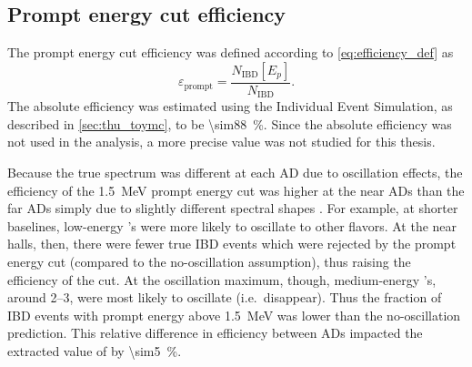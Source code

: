 \subsection{Prompt energy cut efficiency}
\label{subsec:eff_prompt}

The prompt energy cut efficiency was defined
according to \cref{eq:efficiency_def} as
\begin{equation}\label{eq:prompt_eff}
    \varepsilon_\text{prompt} = \frac{N_\text{IBD}[E_p]}{N_\text{IBD}}.
\end{equation}
The absolute efficiency was estimated using the Individual Event Simulation,
as described in \cref{sec:thu_toymc}, to be \SI{\sim88}{\percent}.
Since the absolute efficiency was not used in the \thetaot{} analysis,
a more precise value was not studied for this thesis.

Because the true \nuebar{} spectrum was different at each AD
due to oscillation effects,
the efficiency of the \SI{1.5}{\MeV} prompt energy cut
was higher at the near ADs than the far ADs
simply due to slightly different spectral shapes \cite{nh2016}.
For example, at shorter baselines, low-energy \nuebar{}'s
were more likely to oscillate to other flavors. At the near halls, then,
there were fewer true IBD events which were rejected by the prompt energy cut
(compared to the no-oscillation assumption),
thus raising the efficiency of the cut.
At the oscillation maximum, though, medium-energy \nuebar{}'s,
around \SIrange{2}{3}{\mev}, were most likely to oscillate (i.e.\ disappear).
Thus the fraction of IBD events with prompt energy above \SI{1.5}{\MeV}
was lower than the no-oscillation prediction.
This relative difference in efficiency between ADs
impacted the extracted value of \thetaot{} by \SI{\sim5}{\percent}.

